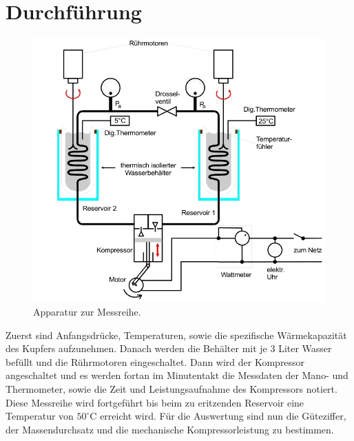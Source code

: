 \section{Durchführung}
\label{sec:Durchführung}
\begin{figure}
  \centering
  \includegraphics{data/Abb2.jpg}
  \caption{Apparatur zur Messreihe. \cite{AnleitungV206}}
  \label{fig:Abb2}
\end{figure}
Zuerst sind Anfangsdrücke, Temperaturen, sowie die spezifische Wärmekapazität des Kupfers aufzunehmen.
Danach werden die Behälter mit je 3 Liter Wasser befüllt und die Rührmotoren eingeschaltet.
Dann wird der Kompressor angeschaltet und es werden fortan im Minutentakt die Messdaten der Mano- und Thermometer, sowie die Zeit und Leistungsaufnahme des Kompressors notiert.
Diese Messreihe wird fortgeführt bis beim zu eritzenden Reservoir eine Temperatur von $50^\circ\text{C}$ erreicht wird.
Für die Auswertung sind nun die Güteziffer, der Massendurchsatz und die mechanische Kompressorleistung zu bestimmen.
